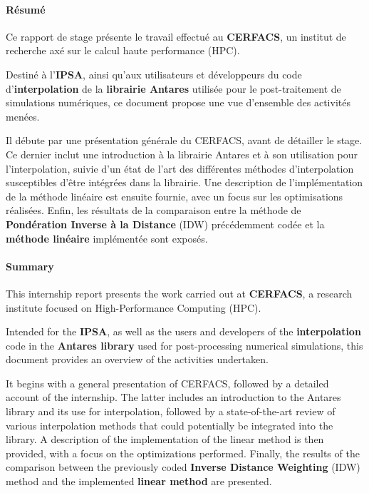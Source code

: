 
\cleardoublepage

\paragraph{Résumé}

\vspace{0,5cm}

Ce rapport de stage présente le travail effectué au \textbf{CERFACS}, un institut de recherche axé sur le calcul haute performance (HPC).

Destiné à l'\textbf{IPSA}, ainsi qu'aux utilisateurs et développeurs du code d'\textbf{interpolation} de la \textbf{librairie Antares} utilisée pour le post-traitement de simulations numériques, ce document propose une vue d'ensemble des activités menées.

Il débute par une présentation générale du CERFACS, avant de détailler le stage.
Ce dernier inclut une introduction à la librairie Antares et à son utilisation pour l'interpolation, suivie d'un état de l'art des différentes méthodes d'interpolation susceptibles d'être intégrées dans la librairie.
Une description de l'implémentation de la méthode linéaire est ensuite fournie, avec un focus sur les optimisations réalisées.
Enfin, les résultats de la comparaison entre la méthode de \textbf{Pondération Inverse à la Distance} (IDW) précédemment codée et la \textbf{méthode linéaire} implémentée sont exposés.

\paragraph{Summary}

\vspace{0,5cm}

This internship report presents the work carried out at \textbf{CERFACS}, a research institute focused on High-Performance Computing (HPC).

Intended for the \textbf{IPSA}, as well as the users and developers of the \textbf{interpolation} code in the \textbf{Antares library} used for post-processing numerical simulations, this document provides an overview of the activities undertaken.

It begins with a general presentation of CERFACS, followed by a detailed account of the internship.
The latter includes an introduction to the Antares library and its use for interpolation, followed by a state-of-the-art review of various interpolation methods that could potentially be integrated into the library.
A description of the implementation of the linear method is then provided, with a focus on the optimizations performed.
Finally, the results of the comparison between the previously coded \textbf{Inverse Distance Weighting} (IDW) method and the implemented \textbf{linear method} are presented.